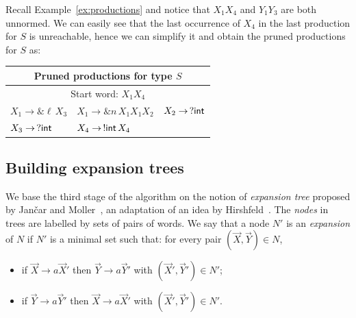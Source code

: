 \begin{example}
  \label{ex:prune}
  Recall Example~\ref{ex:productions} and notice that $X_1 X_4$ and $Y_1 Y_3$
  are both unnormed. We can easily see that the last occurrence of
  $X_4$ in the last production for $S$ is unreachable, hence we can
  simplify it and obtain the pruned productions for $S$ as:
  \begin{center}
    \begin{tabular}{l l l}
      \multicolumn{3}{c}{Pruned productions for type $S$}\\ \hline
      \multicolumn{3}{c}{Start word: $X_1X_4$}\\
      $X_1 \rightarrow \& \ell\, X_3$  &
      $X_1 \rightarrow \& n\, X_1 X_1 X_2$ &
      $X_2 \rightarrow \,? \mathsf{int}$ 
      \\
      $X_3 \rightarrow \,? \mathsf{int}$ &
      $X_4 \rightarrow \,!\mathsf{int}\, X_4$
    \end{tabular}
  \end{center}
\end{example}

\subsection{Building expansion trees}
\label{subsec:expand}


We base the third stage of the algorithm on the notion of
\emph{expansion tree} proposed by Jan{\v{c}}ar and
Moller~\cite{janvcar1999techniques}, an adaptation of an idea by
Hirshfeld~\cite{hirshfeld1996bisimulation}. The \emph{nodes} in trees
are labelled by sets of pairs of words.
%
We say that a node $N'$ is an \emph{expansion} of $N$ if $N'$ is a
minimal set such that: for every pair $(\vec X, \vec Y) \in N$,
\begin{itemize}
\item if $\vec X \rightarrow a\vec X'$ then
  $\vec Y \rightarrow a\vec Y'$ with $(\vec X',\vec Y')\in N'$;
\item if $\vec Y \rightarrow a\vec Y'$ then
  $\vec X \rightarrow a \vec X'$ with $(\vec X',\vec Y')\in N'$.
\end{itemize}

